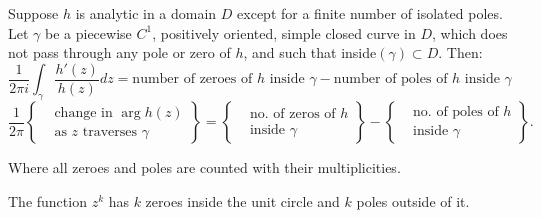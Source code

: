 \begin{theorem}
    Suppose $h$ is analytic in a domain $D$ except for a finite number of isolated poles. Let $\gamma$ be a piecewise $C^{1}$, positively oriented, simple closed curve in $D$, which does not pass through any pole or zero of $h$, and such that inside$(\gamma) \subset D$. Then:
    $$\frac{1}{2\pi i}\int_{\gamma} \frac{h'(z)}{h(z)}dz = \text{number of zeroes of } h \text{ inside } \gamma - \text{number of poles of } h \text{ inside } \gamma$$
    $$
        \frac{1}{2\pi}
        \left\{
        \begin{aligned}
             & \text{change in } \arg h(z)            \\
             & \text{as } z \text{ traverses } \gamma
        \end{aligned}
        \right\}
        =
        \left\{
        \begin{aligned}
             & \text{no. of zeros of } h \\
             & \text{inside } \gamma
        \end{aligned}
        \right\}
        -
        \left\{
        \begin{aligned}
             & \text{no. of poles of } h \\
             & \text{inside } \gamma
        \end{aligned}
        \right\}.
    $$

    Where all zeroes and poles are counted with their multiplicities.
\end{theorem}

\begin{example}
    The function $z^k$ has $k$ zeroes inside the unit circle and $k$ poles outside of it.
\end{example}

